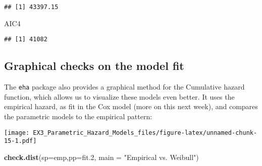 \documentclass[
]{article}
\newenvironment{Shaded}{\begin{snugshade}}{\end{snugshade}}
\newcommand{\DataTypeTok}[1]{\textcolor[rgb]{0.13,0.29,0.53}{#1}}
\newcommand{\DecValTok}[1]{\textcolor[rgb]{0.00,0.00,0.81}{#1}}
\newcommand{\FloatTok}[1]{\textcolor[rgb]{0.00,0.00,0.81}{#1}}
\newcommand{\KeywordTok}[1]{\textcolor[rgb]{0.13,0.29,0.53}{\textbf{#1}}}
\newcommand{\NormalTok}[1]{#1}
\newcommand{\OperatorTok}[1]{\textcolor[rgb]{0.81,0.36,0.00}{\textbf{#1}}}
\newcommand{\StringTok}[1]{\textcolor[rgb]{0.31,0.60,0.02}{#1}}
\begin{document}
\begin{verbatim}
## [1] 43397.15
\end{verbatim}

\begin{Shaded}
\begin{Highlighting}[]
\NormalTok{AIC4}
\end{Highlighting}
\end{Shaded}

\begin{verbatim}
## [1] 41082
\end{verbatim}

\hypertarget{graphical-checks-on-the-model-fit}{%
\subsection{Graphical checks on the model
fit}\label{graphical-checks-on-the-model-fit}}

The \texttt{eha} package also provides a graphical method for the
Cumulative hazard function, which allows us to visualize these models
even better. It uses the empirical hazard, as fit in the Cox model (more
on this next week), and compares the parametric models to the empirical
pattern:

\begin{Shaded}
\end{Shaded}

\texttt{[image: EX3\_Parametric\_Hazard\_Models\_files/figure-latex/unnamed-chunk-15-1.pdf]}

\begin{Shaded}
\begin{Highlighting}[]
\KeywordTok{check.dist}\NormalTok{(}\DataTypeTok{sp=}\NormalTok{emp,}\DataTypeTok{pp=}\NormalTok{fit}\FloatTok{.2}\NormalTok{, }\DataTypeTok{main =} \StringTok{"Empirical vs. Weibull"}\NormalTok{)}
\end{Highlighting}
\end{Shaded}
\end{document}
